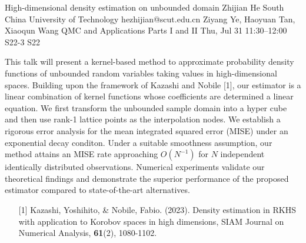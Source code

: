 \begin{talk}
  {High-dimensional density estimation on  unbounded domain}%
  {Zhijian He}%
  {South China University of Technology}%
  {hezhijian@scut.edu.cn}%
  {Ziyang Ye, Haoyuan Tan, Xiaoqun Wang}%
  {QMC and Applications Parts I and II}%
  {Thu, Jul 31 11:30–12:00}%
  {S22-3}%
  {S22}%
				
			
This talk will present a kernel-based method to approximate probability density functions of unbounded random variables taking values in high-dimensional spaces. Building upon the framework of Kazashi and Nobile [1], our estimator is a linear combination of kernel functions whose coefficients are determined a linear equation. We first transform the unbounded sample domain into a hyper cube and then use rank-1 lattice points as the interpolation nodes.
We establish a rigorous error analysis for the mean integrated squared error (MISE) under an exponential decay conditon.  Under a suitable smoothness assumption, our method attains an MISE rate  approaching $O(N^{-1})$ for $N$ independent identically distributed observations. Numerical experiments validate our theoretical findings and demonstrate the superior performance of the proposed estimator compared to state-of-the-art alternatives.
\medskip


\begin{enumerate}
	\item[{[1]}] Kazashi, Yoshihito, \& Nobile, Fabio. (2023). Density estimation in {RKHS} with application to Korobov spaces in high dimensions, SIAM Journal on Numerical Analysis, \textbf{61}(2), 1080-1102.
\end{enumerate}

\end{talk}

